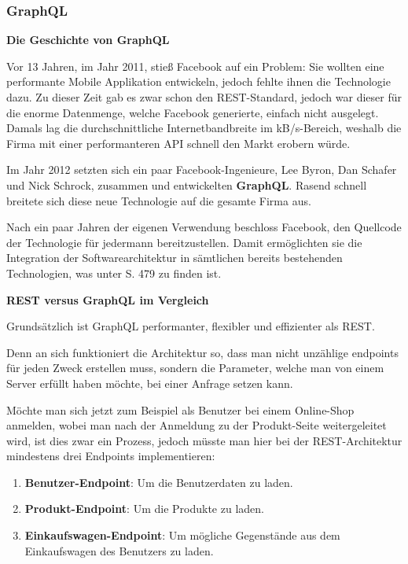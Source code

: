 \subsubsection{GraphQL}

\textbf{Die Geschichte von GraphQL}

Vor 13 Jahren, im Jahr 2011, stieß Facebook auf ein Problem: Sie wollten eine performante Mobile Applikation entwickeln, jedoch fehlte ihnen die Technologie dazu. Zu dieser Zeit gab es zwar schon den REST-Standard, jedoch war dieser für die enorme Datenmenge, welche Facebook generierte, einfach nicht ausgelegt. Damals lag die durchschnittliche Internetbandbreite im kB/s-Bereich, weshalb die Firma mit einer performanteren API schnell den Markt erobern würde.

Im Jahr 2012 setzten sich ein paar Facebook-Ingenieure, Lee Byron, Dan Schafer und Nick Schrock, zusammen und entwickelten \textbf{GraphQL}. Rasend schnell breitete sich diese neue Technologie auf die gesamte Firma aus. 

Nach ein paar Jahren der eigenen Verwendung beschloss Facebook, den Quellcode der Technologie für jedermann bereitzustellen. Damit ermöglichten sie die Integration der Softwarearchitektur in sämtlichen bereits bestehenden Technologien, was unter \cite{book-modern-api-development-packt} S. 479 zu finden ist.
\newline

\textbf{REST versus GraphQL im Vergleich}

Grundsätzlich ist GraphQL performanter, flexibler und effizienter als REST.

Denn an sich funktioniert die Architektur so, dass man nicht unzählige \gls{endpoints} für jeden Zweck erstellen muss, sondern die Parameter, welche man von einem Server erfüllt haben möchte, bei einer Anfrage setzen kann.

Möchte man sich jetzt zum Beispiel als Benutzer bei einem Online-Shop anmelden, wobei man nach der Anmeldung zu der Produkt-Seite weitergeleitet wird, ist dies zwar ein Prozess, jedoch müsste man hier bei der REST-Architektur mindestens drei Endpoints implementieren:

\begin{enumerate}
    \item \textbf{Benutzer-Endpoint}: Um die Benutzerdaten zu laden.
    \item \textbf{Produkt-Endpoint}: Um die Produkte zu laden.
    \item \textbf{Einkaufswagen-Endpoint}: Um mögliche Gegenstände aus dem Einkaufswagen des Benutzers zu laden.
\end{enumerate}

